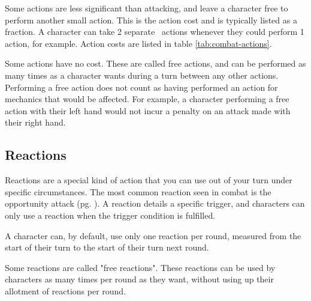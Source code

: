 \begin{multicols*}{2}
    Some actions are less significant than attacking, and leave a character
    free to perform another small action. This is the action
    cost and is typically listed as a fraction. A character
    can take 2 separate \textonehalf\ actions whenever they could perform 1
    action, for example. Action costs are listed in table
    \ref{tab:combat-actions}.

    Some actions have no cost. These are called free
    actions, and can be performed as many times as a
    character wants during a turn between any other actions. Performing a free
    action does not count as having performed an action for mechanics that
    would be affected. For example, a character performing a free action with
    their left hand would not incur a penalty on an attack made with their
    right hand.

    \subsection{Reactions}
    Reactions are a special kind of action that you can use out of your turn
    under specific circumstances. The most common reaction seen in combat is
    the opportunity attack (pg. \pageref{combat:opportunity-attacks}). A
    reaction details a specific trigger, and characters can only use a reaction
    when the trigger condition is fulfilled.

    A character can, by default, use only one reaction per round, measured
    from the start of their turn to the start of their turn next round.

    Some reactions are called "free reactions". These
    reactions can be used by characters as many times per round as they want,
    without using up their allotment of reactions per round.


\end{multicols*}
